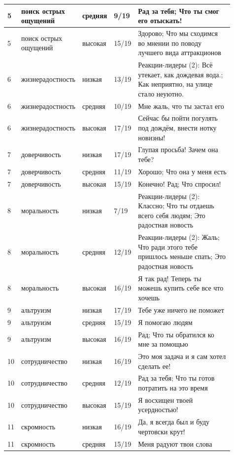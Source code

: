 \begin{landscape}
\begin{longtable}{|p{0.06\linewidth}|p{0.2\linewidth}|p{0.11\linewidth}|p{0.08\linewidth}|p{0.46\linewidth}|}
		\hline
		5 & поиск острых ощущений & средняя & 9/19 & Рад за тебя; Что ты смог его отыскать! \\
		\hline
		5 & поиск острых ощущений & высокая & 15/19 & Здорово; Что мы сходимся во мнении по поводу лучшего вида аттракционов \\
		\hline
		6 & жизнерадостность & низкая & 13/19 & Реакции-лидеры (2): Всё утекает, как дождевая вода.; Как неприятно, на улице стало неуютно. \\
		\hline
		6 & жизнерадостность & средняя & 10/19 & Мне жаль, что ты застал его \\
		\hline
		6 & жизнерадостность & высокая & 17/19 & Сейчас бы пойти погулять под дождём, внести нотку новизны! \\
		\hline
		7 & доверчивость & низкая & 17/19 & Глупая просьба! Зачем она тебе? \\
		\hline
		7 & доверчивость & средняя & 11/19 & Хорошо; Что она у меня есть \\
		\hline
		7 & доверчивость & высокая & 15/19 & Конечно! Рад; Что спросил! \\
		\hline
		8 & моральность & низкая & 7/19 & Реакции-лидеры (2): Классно; Что ты отдаешь всего себя людям; Это радостная новость \\
		\hline
		8 & моральность & средняя & 12/19 & Реакции-лидеры (2): Жаль; Что ради этого тебе пришлось меньше спать; Это радостная новость \\
		\hline
		8 & моральность & высокая & 16/19 & Я так рад! Теперь ты можешь купить себе все что хочешь \\
		\hline
		9 & альтруизм & низкая & 17/19 & Тебе уже ничего не поможет \\
		\hline
		9 & альтруизм & средняя & 15/19 & Я помогаю людям \\
		\hline
		9 & альтруизм & высокая & 16/19 & Рад; Что ты обратился ко мне за помощью \\
		\hline
		10 & сотрудничество & низкая & 16/19 & Это моя задача и я сам хотел сделать ее! \\
		\hline
		10 & сотрудничество & средняя & 12/19 & Рад за тебя; Что ты готов потратить на это время \\
		\hline
		10 & сотрудничество & высокая & 15/19 & Я восхищен твоей усердностью! \\
		\hline
		11 & скромность & низкая & 16/19 & Да, я всегда был и буду чертовски крут! \\
		\hline
		11 & скромность & средняя & 15/19 & Меня радуют твои слова \\

\end{longtable}
\end{landscape}
